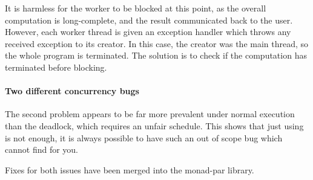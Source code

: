 It is harmless for the worker to be blocked at this point, as the
overall computation is long-complete, and the result communicated back
to the user.  However, each worker thread is given an exception
handler which throws any received exception to its creator.  In this
case, the creator was the main thread, so the whole program is
terminated.  The solution is to check if the computation has
terminated before blocking.

\paragraph{Two different concurrency bugs}
The second problem appears to be far more prevalent under normal
execution than the deadlock, which requires an unfair schedule.  This
shows that just using \dejafu{} is not enough, it is always possible
to have such an out of scope bug which \dejafu{} cannot find for you.

Fixes for both issues have been merged into the monad-par library.

